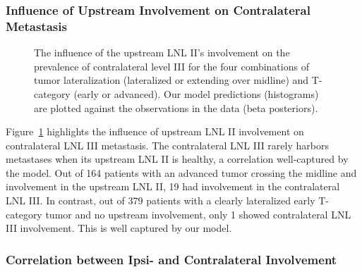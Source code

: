 \documentclass[
  sn-mathphys-num,
]{sn-jnl}
\makeatletter
\newcommand*\pandocbounded[1]{%
  \sbox\pandoc@box{#1}%
  \Gscale@div\@tempa{\textheight}{\dimexpr\ht\pandoc@box+\dp\pandoc@box\relax}%
  \Gscale@div\@tempb{\linewidth}{\wd\pandoc@box}%
  \ifdim\@tempb\p@<\@tempa\p@\let\@tempa\@tempb\fi%
  \ifdim\@tempa\p@<\p@\scalebox{\@tempa}{\usebox\pandoc@box}%
  \else\usebox{\pandoc@box}%
  \fi%
}
\makeatother
\begin{document}
\subsubsection{Influence of Upstream Involvement on Contralateral
Metastasis}\label{influence-of-upstream-involvement-on-contralateral-metastasis}

\begin{figure}

\centering{

\pandocbounded{}

}

\caption{\label{fig-model-prevalences-upstream}The influence of the
upstream LNL II's involvement on the prevalence of contralateral level
III for the four combinations of tumor lateralization (lateralized or
extending over midline) and T-category (early or advanced). Our model
predictions (histograms) are plotted against the observations in the
data (beta posteriors).}

\end{figure}%

Figure~\ref{fig-model-prevalences-upstream} highlights the influence of
upstream LNL II involvement on contralateral LNL III metastasis. The
contralateral LNL III rarely harbors metastases when its upstream LNL II
is healthy, a correlation well-captured by the model. Out of 164
patients with an advanced tumor crossing the midline and involvement in
the upstream LNL II, 19 had involvement in the contralateral LNL III. In
contrast, out of 379 patients with a clearly lateralized early
T-category tumor and no upstream involvement, only 1 showed
contralateral LNL III involvement. This is well captured by our model.

\subsubsection{Correlation between Ipsi- and Contralateral
Involvement}\label{correlation-between-ipsi--and-contralateral-involvement}
\end{document}
